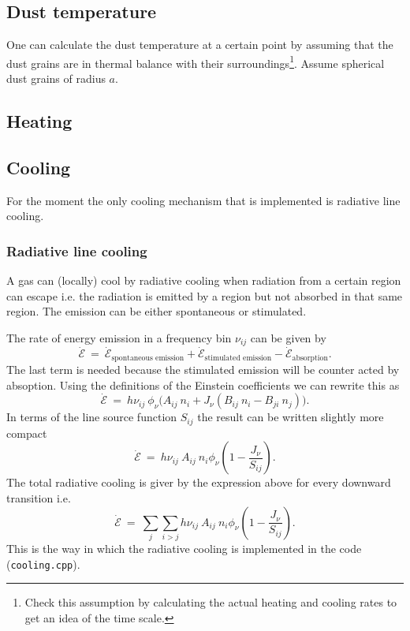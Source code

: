 \documentclass[]{article}
\begin{document}
\subsection{Dust temperature}

One can calculate the dust temperature at a certain point by assuming that the dust grains are in thermal balance with their surroundings\footnote{Check this assumption by calculating the actual heating and cooling rates to get an idea of the time scale.}. Assume spherical dust grains of radius $a$.


\subsection{Heating}



\subsection{Cooling}

For the moment the only cooling mechanism that is implemented is radiative line cooling.

\subsubsection{Radiative line cooling}

A gas can (locally) cool by radiative cooling when radiation from a certain region can escape i.e. the radiation is emitted by a region but not absorbed in that same region. The emission can be either spontaneous or stimulated.

\bigskip

The rate of energy emission in a frequency bin $\nu_{ij}$ can be given by
\begin{equation}
\dot{\mathcal{E}} \ = \ \dot{\mathcal{E}}_{\text{spontaneous emission}} + \dot{\mathcal{E}}_{\text{stimulated emission}} - \dot{\mathcal{E}}_{\text{absorption}} .
\end{equation}
The last term is needed because the stimulated emission will be counter acted by absoption. Using the definitions of the Einstein coefficients we can rewrite this as
\begin{equation}
\dot{\mathcal{E}} \ = \ h\nu_{ij} \ \phi_{\nu} \Big( A_{ij} \ n_{i}  + J_{\nu} \left( B_{ij} \ n_{i} - B_{ji} \ n_{j} \right) \Big).
\end{equation}
In terms of the line source function $S_{ij}$ the result can be written slightly more compact
\begin{equation}
\dot{\mathcal{E}} \ = \ h\nu_{ij} \ A_{ij} \ n_{i}  \phi_{\nu} \left( 1  - \frac{J_{\nu}}{S_{ij}} \right).
\end{equation}
The total radiative cooling is giver by the expression above for every downward transition i.e.
\begin{equation}
\dot{\mathcal{E}} \ = \ \sum_{j} \sum_{i>j} h\nu_{ij} \ A_{ij} \ n_{i}  \phi_{\nu} \left( 1  - \frac{J_{\nu}}{S_{ij}} \right).
\end{equation}
This is the way in which the radiative cooling is implemented in the code (\texttt{cooling.cpp}).
\end{document}
